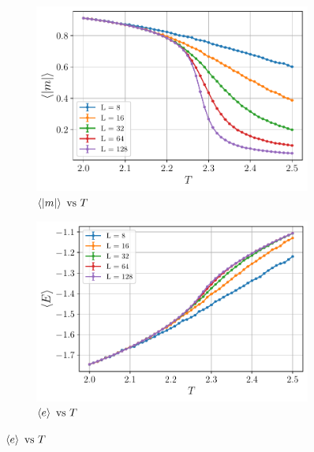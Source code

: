 \documentclass[../thesis_main.tex]{subfiles}
\begin{document}
\begin{figure}[!htb]
    \centering
    \begin{subfigure}[b]{0.49\textwidth}  %
        \centering
        \includegraphics[width=\textwidth]{images/monte_carlo/wolff_cluster/abs(mag).pdf}
        \caption{$\expval{\abs{m}} \text{ vs } T$}
        \label{magnetization}
    \end{subfigure}
    \begin{subfigure}[b]{0.49\textwidth}
        \centering
        \includegraphics[width=\textwidth]{images/monte_carlo/wolff_cluster/edens.pdf}
        \caption{$\expval{e} \text{ vs } T$}
    \end{subfigure}
\end{figure}
\end{document}
